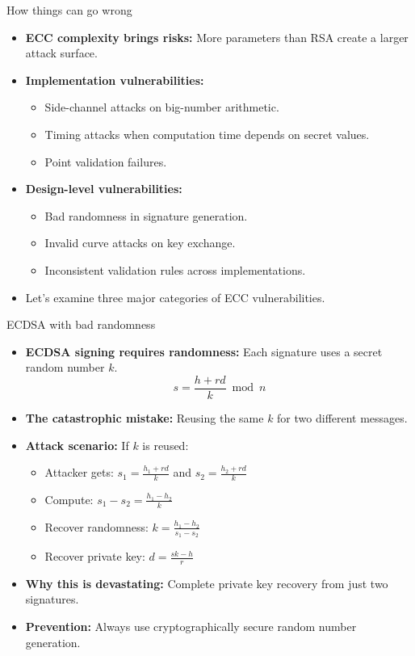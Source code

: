 \documentclass[aspectratio=169, lualatex, handout]{beamer}
\begin{document}
\begin{frame}{How things can go wrong}
	\begin{itemize}[<+->]
		\item \textbf{ECC complexity brings risks:} More parameters than RSA create a larger attack surface.
		\item \textbf{Implementation vulnerabilities:}
		      \begin{itemize}
			      \item Side-channel attacks on big-number arithmetic.
			      \item Timing attacks when computation time depends on secret values.
			      \item Point validation failures.
		      \end{itemize}
		\item \textbf{Design-level vulnerabilities:}
		      \begin{itemize}
			      \item Bad randomness in signature generation.
			      \item Invalid curve attacks on key exchange.
			      \item Inconsistent validation rules across implementations.
		      \end{itemize}
		\item Let's examine three major categories of ECC vulnerabilities.
	\end{itemize}
\end{frame}

\begin{frame}{ECDSA with bad randomness}
	\begin{itemize}[<+->]
		\item \textbf{ECDSA signing requires randomness:} Each signature uses a secret random number $k$.
		      $$s = \frac{h + rd}{k} \bmod n$$
		\item \textbf{The catastrophic mistake:} Reusing the same $k$ for two different messages.
		\item \textbf{Attack scenario:} If $k$ is reused:
		      \begin{itemize}
			      \item Attacker gets: $s_1 = \frac{h_1 + rd}{k}$ and $s_2 = \frac{h_2 + rd}{k}$
			      \item Compute: $s_1 - s_2 = \frac{h_1 - h_2}{k}$
			      \item Recover randomness: $k = \frac{h_1 - h_2}{s_1 - s_2}$
			      \item Recover private key: $d = \frac{sk - h}{r}$
		      \end{itemize}
		\item \textbf{Why this is devastating:} Complete private key recovery from just two signatures.
		\item \textbf{Prevention:} Always use cryptographically secure random number generation.
	\end{itemize}
\end{frame}
\end{document}
